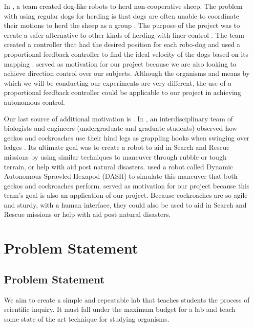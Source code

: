 \documentclass{article}
\begin{document}
%
In \cite{pierson2015bioinspired}%
, a team created dog-like robots to herd non-cooperative sheep. The problem with using regular dogs for herding is that dogs are often unable to coordinate their motions to herd the sheep as a group \cite{pierson2015bioinspired}. The purpose of the project was to create a safer alternative to other kinds of herding with finer control \cite{pierson2015bioinspired}. The team created a controller that had the desired position for each robo-dog and used a proportional feedback controller to find the ideal velocity of the dogs based on its mapping \cite{pierson2015bioinspired}. \cite{pierson2015bioinspired} served as motivation for our project because we are also looking to achieve direction control over our subjects. Although the organisms and means by which we will be conducting our experiments are very different, the use of a proportional feedback controller could be applicable to our project in achieving autonomous control. %



Our last source of additional motivation is \cite{mongeau2012rapid}. In \cite{mongeau2012rapid}, an interdisciplinary team of biologists and engineers (undergraduate and graduate students)  observed how geckos and cockroaches use their hind legs as grappling hooks when swinging over ledges \cite{mongeau2012rapid}. Its ultimate goal was to create a robot to aid in Search and Rescue missions by using similar techniques to maneuver through rubble or tough terrain, or help with aid post natural disasters. \cite{mongeau2012rapid} used  a robot called Dynamic Autonomous Sprawled Hexapod (DASH) to simulate this maneuver that both geckos and cockroaches perform. \cite{mongeau2012rapid} served as motivation for our project because this team's goal is also an application of our project. Because cockroaches are so agile and sturdy, with a human interface, they could also be used to aid in Search and Rescue missions or help with aid post natural disasters.%

\section{Problem Statement}

\subsection{Problem Statement}
 We aim to create a simple and repeatable lab that teaches students the process of scientific inquiry. It must fall under the maximum budget for a lab and teach some state of the art technique for studying organisms.
\end{document}
